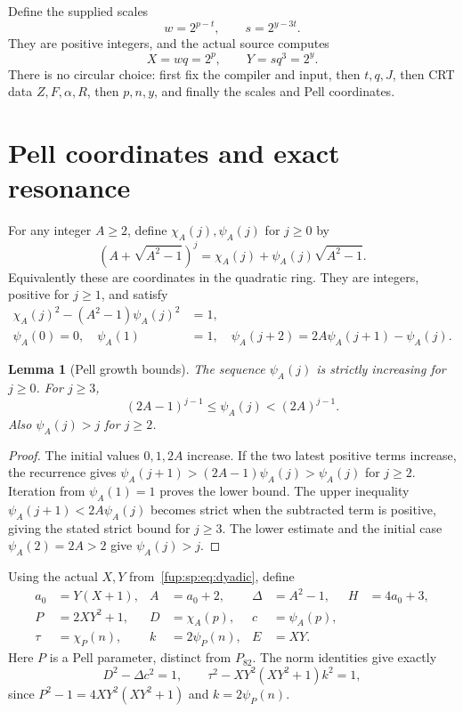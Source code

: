\documentclass[11pt,letterpaper]{article}
\newtheorem{lemma}[theorem]{Lemma}
\theoremstyle{definition}\newtheorem{definition}[theorem]{Definition}
\theoremstyle{remark}\newtheorem{remark}[theorem]{Remark}
\newcommand{\D}{\Delta}
\newcommand{\ch}[2]{\chi_{#1}(#2)}\newcommand{\ps}[2]{\psi_{#1}(#2)}
\begin{document}
Define the supplied scales
\begin{equation}
w=2^{p-t},\qquad s=2^{y-3t}.
\label{fup:sp:eq:scales}
\end{equation}
They are positive integers, and the actual source computes
\begin{equation}
X=wq=2^p,\qquad Y=sq^3=2^y.
\label{fup:sp:eq:dyadic}
\end{equation}
There is no circular choice: first fix the compiler and input, then
$t,q,J$, then CRT data $Z,F,\alpha,R$, then $p,n,y$, and finally
the scales and Pell coordinates.

\section{Pell coordinates and exact resonance}
\label{fup:sp:sec:pell}
For any integer $A\ge2$, define $\ch A j,\ps A j$ for $j\ge0$ by
\begin{equation}
(A+\sqrt{A^2-1})^j=\ch A j+\ps A j\sqrt{A^2-1}.
\label{fup:sp:eq:pell-def}
\end{equation}
Equivalently these are coordinates in the quadratic ring. They are
integers, positive for $j\ge1$, and satisfy
\begin{align}
\ch A j^2-(A^2-1)\ps A j^2&=1,\label{fup:sp:eq:pellnorm}\\
\ps A0=0,\quad \ps A1&=1,\quad
\ps A{j+2}=2A\ps A{j+1}-\ps A j.\label{fup:sp:eq:pellrec}
\end{align}

\begin{lemma}[Pell growth bounds]
\label{fup:sp:lem:pellbounds}
The sequence $\ps A j$ is strictly increasing for $j\ge0$.
For $j\ge3$,
\begin{equation}
(2A-1)^{j-1}\le\ps A j<(2A)^{j-1}.
\label{fup:sp:eq:pellbounds}
\end{equation}
Also $\ps A j>j$ for $j\ge2$.
\end{lemma}
\begin{proof}
The initial values $0,1,2A$ increase. If the two latest positive
terms increase, the recurrence gives
$\ps A{j+1}>(2A-1)\ps A j>\ps A j$ for $j\ge2$.
Iteration from $\ps A1=1$ proves the lower bound.
The upper inequality $\ps A{j+1}<2A\ps A j$ becomes strict when
the subtracted term is positive, giving the stated strict bound for
$j\ge3$. The lower estimate and the initial case $\ps A2=2A>2$
give $\ps A j>j$.
\end{proof}

Using the actual $X,Y$ from~\eqref{fup:sp:eq:dyadic}, define
\begin{align}
a_0&=Y(X+1),&A&=a_0+2,&\D&=A^2-1,&H&=4a_0+3,\\
P&=2XY^2+1,&D&=\ch A p,&c&=\ps A p,\\
\tau&=\ch P n,&k&=2\ps P n,&E&=XY.
\label{fup:sp:eq:pellchoices}
\end{align}
Here $P$ is a Pell parameter, distinct from $P_{82}$. The norm
identities give exactly
\begin{equation}
D^2-\D c^2=1,\qquad
\tau^2-XY^2(XY^2+1)k^2=1,
\label{fup:sp:eq:norms}
\end{equation}
since $P^2-1=4XY^2(XY^2+1)$ and $k=2\ps P n$.
\end{document}
